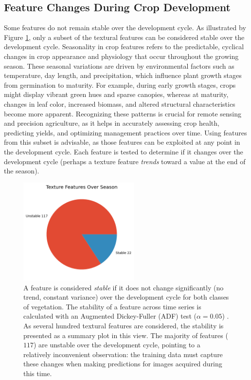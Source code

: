 \documentclass[letterpaper]{report}
\begin{document}
\subsection{Feature Changes During Crop Development}
Some features do not remain stable over the development cycle. As illustrated by Figure \ref{fig:season-texture}, only a subset of the textural features can be considered stable over the development cycle. Seasonality in crop features refers to the predictable, cyclical changes in crop appearance and physiology that occur throughout the growing season. These seasonal variations are driven by environmental factors such as temperature, day length, and precipitation, which influence plant growth stages from germination to maturity. For example, during early growth stages, crops might display vibrant green hues and sparse canopies, whereas at maturity, changes in leaf color, increased biomass, and altered structural characteristics become more apparent. Recognizing these patterns is crucial for remote sensing and precision agriculture, as it helps in accurately assessing crop health, predicting yields, and optimizing management practices over time. Using features from this subset is advisable, as those features can be exploited at any point in the development cycle.  Each feature is tested to determine if it changes over the development cycle (perhaps a texture feature \textit{trends} toward a value at the end of the season).

%


\begin{figure}[h!]
	\centering
	\includegraphics[width=6cm]{./figures/season-texture.png}
	\caption[Stability of factor over growing season]{A feature is considered \textit{stable} if it does not change significantly (no trend, constant variance) over the development cycle for both classes of vegetation. The stability of a feature across time series is calculated with an Augmented Dickey-Fuller (ADF) test ($\alpha=0.05$) \parencite{Dickey1979-ft}. As several hundred textural features are considered, the stability is presented as a summary plot in this view. The majority of features ($117$) are unstable over the development cycle, pointing to a relatively inconvenient observation: the training data must capture these changes when making predictions for images acquired during this time.}
	\label{fig:season-texture}
\end{figure}
\end{document}
